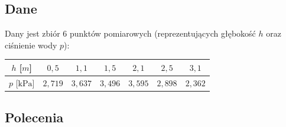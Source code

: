 \documentclass[a4paper,11pt]{article}
\begin{document}
\subsection*{Dane}

Dany jest zbiór 6 punktów pomiarowych (reprezentujących głębokość $h$ oraz ciśnienie wody $p$):

\begin{center}
\begin{tabular}{c|cccccc}
  \toprule
  $h$ [$m$] & $0{,}5$ & $1{,}1$ & $1{,}5$ & $2{,}1$ & $2{,}5$ & $3{,}1$ \\
  \midrule
  $p$ [$\text{kPa}$] & $2{,}719$ & $3{,}637$ & $3{,}496$ & $3{,}595$ & $2{,}898$ & $2{,}362$ \\
  \bottomrule
\end{tabular}
\end{center}

\subsection*{Polecenia}
\end{document}
